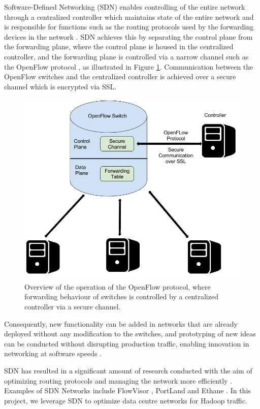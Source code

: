 Software-Defined Networking (SDN) enables controlling of the entire network through a centralized controller which maintains state of the entire network and is responsible for functions such as the routing protocols used by the forwarding devices in the network \cite{lantz2010network}. SDN achieves this by separating the control plane from the forwarding plane, where the control plane is housed in the centralized controller, and the forwarding plane is controlled via a narrow channel such as the OpenFlow protocol \cite{mckeown2008openflow}, as illustrated in Figure \ref{fig:OpenFlowOverview}. Communication between the OpenFlow switches and the centralized controller is achieved over a secure channel which is encrypted via SSL. 
\begin{figure}[!ht] 
	\centerline{\includegraphics[scale=0.33]{graphics/chapter2/OpenFlowProtocol.png}}
	\caption{Overview of the operation of the OpenFlow protocol, where forwarding behaviour of switches is controlled by a centralized controller via a secure channel.}
	\label{fig:OpenFlowOverview} 
\end{figure}

Consequently, new functionality can be added in networks that are already deployed without any modification to the switches, and prototyping of new ideas can be conducted  without disrupting production traffic, enabling innovation in networking at software speeds \cite{lantz2010network}. 

SDN has resulted in a significant amount of research conducted with the aim of optimizing routing protocols and managing the network more efficiently \cite{kreutz2015software}. Examples of SDN Networks include FlowVisor \cite{sherwood2010carving}, PortLand \cite{niranjan2009portland} and Ethane \cite{casado2007ethane}. In this project, we leverage SDN to optimize data centre networks for Hadoop \cite{HadoopWeb} traffic. 
